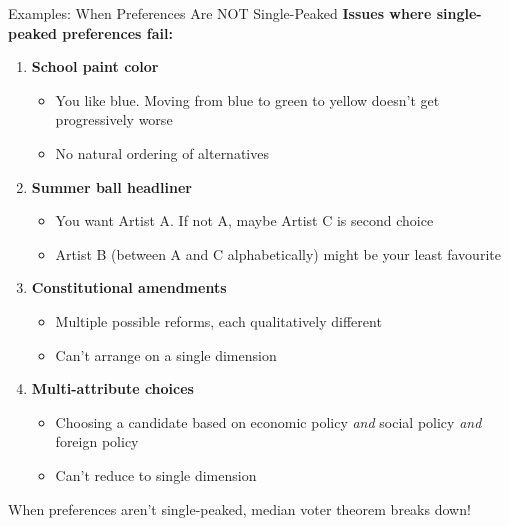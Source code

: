 \documentclass[10pt]{beamer}
\begin{document}
\begin{frame}[allowframebreaks]{Examples: When Preferences Are NOT Single-Peaked}
\textbf{Issues where single-peaked preferences fail:}

\begin{enumerate}
\item \textbf{School paint color}
\begin{itemize}
\item You like blue. Moving from blue to green to yellow doesn't get progressively worse
\item No natural ordering of alternatives
\end{itemize}


\item \textbf{Summer ball headliner}
\begin{itemize}
\item You want Artist A. If not A, maybe Artist C is second choice
\item Artist B (between A and C alphabetically) might be your least favourite
\end{itemize}

   \framebreak 
\item \textbf{Constitutional amendments}
\begin{itemize}
\item Multiple possible reforms, each qualitatively different
\item Can't arrange on a single dimension
\end{itemize}


\item \textbf{Multi-attribute choices}
\begin{itemize}
\item Choosing a candidate based on economic policy \textit{and} social policy \textit{and} foreign policy
\item Can't reduce to single dimension
\end{itemize}
\end{enumerate}



\alert{When preferences aren't single-peaked, median voter theorem breaks down!}
\end{frame}
\end{document}
